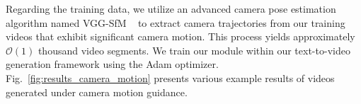 Regarding the training data, we utilize an advanced camera pose estimation algorithm named VGG-SfM ~\citep{wang2024vggsfm} to extract camera trajectories from our training videos that exhibit significant camera motion.
This process yields approximately $\mathcal{O}(1)$ thousand video segments.
We train our module within our text-to-video generation framework using the Adam optimizer.
Fig.~\ref{fig:results_camera_motion} presents various example results of videos generated under camera motion guidance.


